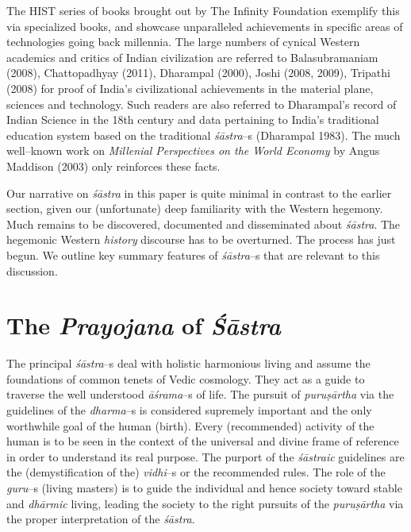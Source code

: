 The HIST series of books brought out by The Infinity Foundation exemplify this via specialized books, and showcase unparalleled achievements in specific areas of technologies going back millennia. The large numbers of cynical Western academics and critics of Indian civilization are referred to Balasubramaniam (2008), Chattopadhyay (2011), Dharampal (2000), Joshi (2008, 2009), Tripathi (2008) for proof of India’s civilizational achievements in the material plane, sciences and technology. Such readers are also referred to Dharampal’s record of Indian Science in the 18th century and data pertaining to India’s traditional education system based on the traditional \textit{śāstra}–s (Dharampal 1983). The much well–known work on \textit{Millenial Perspectives on the World Economy} by Angus Maddison (2003) only reinforces these facts.

Our narrative on \textit{śāstra} in this paper is quite minimal in contrast to the earlier section, given our (unfortunate) deep familiarity with the Western hegemony. Much remains to be discovered, documented and disseminated about \textit{śāstra}. The hegemonic Western \textit{history} discourse has to be overturned. The process has just begun. We outline key summary features of \textit{śāstra}–s that are relevant to this discussion.


\section*{The \textit{Prayojana} of \textit{Śāstra}}

The principal \textit{śāstra}–s deal with holistic harmonious living and assume the foundations of common tenets of Vedic cosmology. They act as a guide to traverse the well understood \textit{āśrama}–s of life. The pursuit of \textit{puruṣārtha} via the guidelines of the \textit{dharma}–s is considered supremely important and the only worthwhile goal of the human (birth). Every (recommended) activity of the human is to be seen in the context of the universal and divine frame of reference in order to understand its real purpose. The purport of the \textit{śāstraic} guidelines are the (demystification of the) \textit{vidhi}–s or the recommended rules. The role of the \textit{guru}–s (living masters) is to guide the individual and hence society toward stable and \textit{dhārmic} living, leading the society to the right pursuits of the \textit{puruṣārtha} via the proper interpretation of the \textit{śāstra}.

